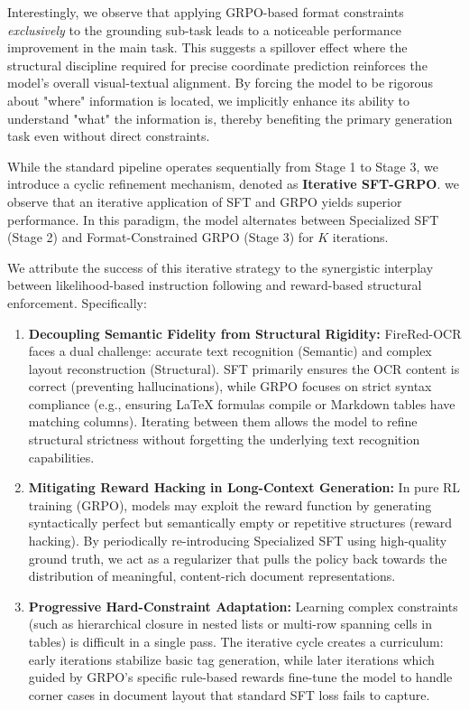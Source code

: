 \begin{insight}[title=Insight 2: Synergistic Gains from Grounding Constraints.]
Interestingly, we observe that applying GRPO-based format constraints \textit{exclusively} to the grounding sub-task leads to a noticeable performance improvement in the main task. This suggests a spillover effect where the structural discipline required for precise coordinate prediction reinforces the model's overall visual-textual alignment. By forcing the model to be rigorous about "where" information is located, we implicitly enhance its ability to understand "what" the information is, thereby benefiting the primary generation task even without direct constraints.
\end{insight}

While the standard pipeline operates sequentially from Stage 1 to Stage 3, we introduce a cyclic refinement mechanism, denoted as \textbf{Iterative SFT-GRPO}. we observe that an iterative application of SFT and GRPO yields superior performance. In this paradigm, the model alternates between Specialized SFT (Stage 2) and Format-Constrained GRPO (Stage 3) for $K$ iterations.

We attribute the success of this iterative strategy to the synergistic interplay between likelihood-based instruction following and reward-based structural enforcement. Specifically:

\begin{enumerate}
    \item \textbf{Decoupling Semantic Fidelity from Structural Rigidity:} 
    FireRed-OCR faces a dual challenge: accurate text recognition (Semantic) and complex layout reconstruction (Structural). SFT primarily ensures the OCR content is correct (preventing hallucinations), while GRPO focuses on strict syntax compliance (e.g., ensuring \LaTeX{} formulas compile or Markdown tables have matching columns). Iterating between them allows the model to refine structural strictness without forgetting the underlying text recognition capabilities.
    
    \item \textbf{Mitigating Reward Hacking in Long-Context Generation:} 
    In pure RL training (GRPO), models may exploit the reward function by generating syntactically perfect but semantically empty or repetitive structures (reward hacking). By periodically re-introducing Specialized SFT using high-quality ground truth, we act as a regularizer that pulls the policy back towards the distribution of meaningful, content-rich document representations.
    
    \item \textbf{Progressive Hard-Constraint Adaptation:} 
    Learning complex constraints (such as hierarchical closure in nested lists or multi-row spanning cells in tables) is difficult in a single pass. The iterative cycle creates a curriculum: early iterations stabilize basic tag generation, while later iterations which guided by GRPO's specific rule-based rewards fine-tune the model to handle corner cases in document layout that standard SFT loss fails to capture.
\end{enumerate}